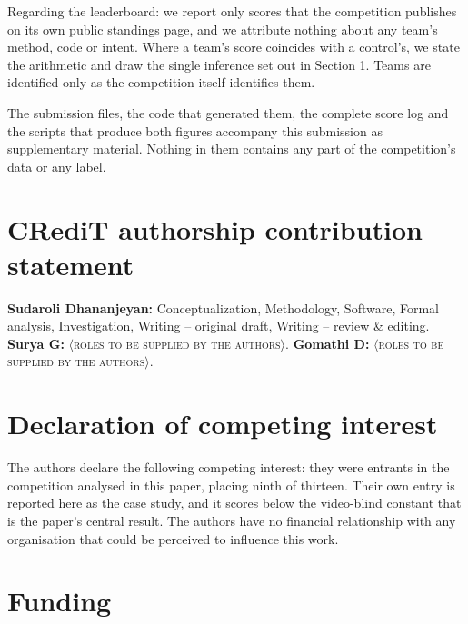 Regarding the leaderboard: we report only scores that the competition publishes on its own public standings page, and we attribute nothing about any team's method, code or intent. Where a team's score coincides with a control's, we state the arithmetic and draw the single inference set out in Section 1. Teams are identified only as the competition itself identifies them.

The submission files, the code that generated them, the complete score log and the scripts that produce both figures accompany this submission as supplementary material. Nothing in them contains any part of the competition's data or any label.

\section*{CRediT authorship contribution statement}


\textbf{Sudaroli Dhananjeyan:} Conceptualization, Methodology, Software, Formal analysis, Investigation, Writing -- original draft, Writing -- review \& editing. \textbf{Surya G:} \textsc{$\langle$roles to be supplied by the authors$\rangle$}. \textbf{Gomathi D:} \textsc{$\langle$roles to be supplied by the authors$\rangle$}.

\section*{Declaration of competing interest}

The authors declare the following competing interest: they were entrants in the competition analysed in this paper, placing ninth of thirteen. Their own entry is reported here as the case study, and it scores below the video-blind constant that is the paper's central result. The authors have no financial relationship with any organisation that could be perceived to influence this work.

\section*{Funding}

